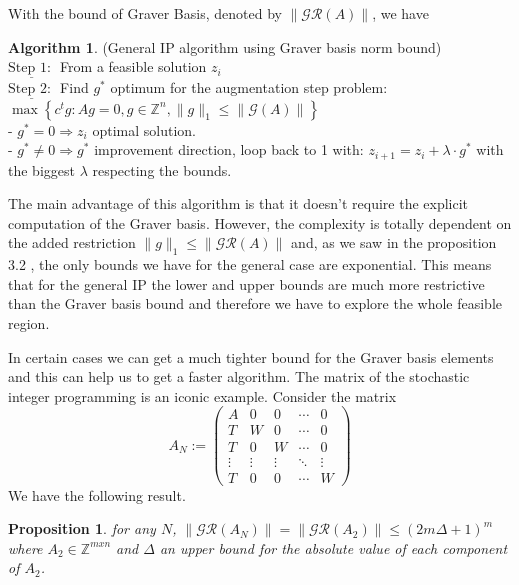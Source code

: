 \documentclass{article}
\theoremstyle{plain}
\newtheorem{proposition}[theorem]{Proposition}
\theoremstyle{definition}
\newtheorem{algorithm}[theorem]{Algorithm}
\begin{document}
With the bound of Graver Basis, denoted by $\|\mathcal{GR}(A)\|$, we have

\begin{algorithm} (General IP algorithm using Graver basis norm bound)\\
$ \underline{\text {Step 1: }}$ From a feasible solution  $z_{i} $\\
$ \underline{\text {Step 2: }}$ Find  $g^{*}$  optimum for the augmentation step problem:  $\max \left\{c^{t} g: A g=0, g \in \mathbb{Z}^{n},\|g\|_{1} \leq\|\mathcal{G}(A)\|\right\} $\\
\indent -  $g^{*}=0 \Longrightarrow z_{i}$  optimal solution. \\
\indent -  $g^{*} \neq 0 \Longrightarrow g^{*}$  improvement direction, loop back to 1 with:  $z_{i+1}=z_{i}+\lambda \cdot g^{*}$  with the biggest  $\lambda$  respecting the bounds. \\
\end{algorithm}

The main advantage of this algorithm is that it doesn't require the explicit computation of the Graver basis. However, the complexity is totally dependent on the added restriction  $\|g\|_{1} \leq\|\mathcal{GR}(A)\|$  and, as we saw in the proposition  3.2 , the only bounds we have for the general case are exponential. This means that for the general IP the lower and upper bounds are much more restrictive than the Graver basis bound and therefore we have to explore the whole feasible region.

In certain cases we can get a much tighter bound for the Graver basis elements and this can help us to get a faster algorithm. The  matrix of  the stochastic integer programming is an iconic example. Consider the matrix
$$
A_N:=\left(\begin{array}{ccccc}
A & 0 & 0 & \cdots & 0 \\
T & W & 0 & \cdots & 0 \\
T & 0 & W & \cdots & 0 \\
\vdots & \vdots & \vdots & \ddots & \vdots \\
T & 0 & 0 & \cdots & W
\end{array}\right)
$$
We have the following result.

\begin{proposition}
for any $N$, $\|\mathcal{GR}(A_{N})\| = \|\mathcal{GR}(A_{2})\|\leq  (2 m \Delta+1)^{m} $  where $A_2 \in \mathbb{Z}^{m x n}$  and  $\Delta$  an upper bound for the absolute value of each component of  $A_2$.
\end{proposition}
\end{document}
